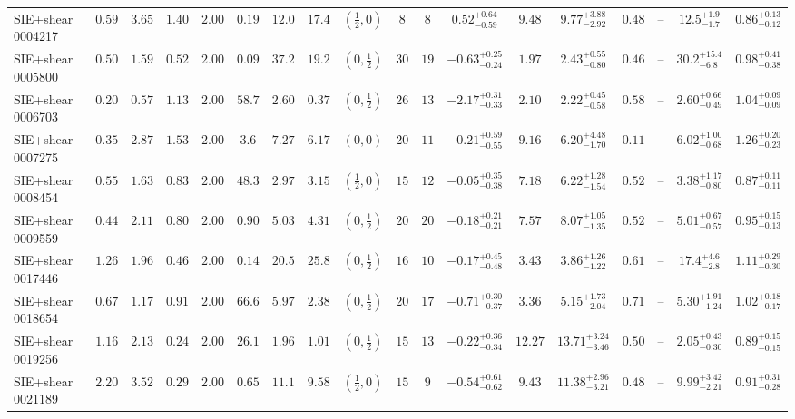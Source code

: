\begin{longtable}{@{}lccccccccccccccccc@{}}
SIE+shear 0004217 & $0.59$ & $3.65$ & $1.40$ & $2.00$ & $0.19$ & $12.0$ & $17.4$ & $(\frac12,0)$ & $8$ & $8$ & $0.52^{+0.64}_{-0.59}$ & $9.48$ & $9.77^{+3.88}_{-2.92}$ & $0.48$ & -- & $12.5^{+1.9}_{-1.7}$ & $0.86^{+0.13}_{-0.12}$\\
SIE+shear 0005800 & $0.50$ & $1.59$ & $0.52$ & $2.00$ & $0.09$ & $37.2$ & $19.2$ & $(0,\frac12)$ & $30$ & $19$ & $-0.63^{+0.25}_{-0.24}$ & $1.97$ & $2.43^{+0.55}_{-0.80}$ & $0.46$ & -- & $30.2^{+15.4}_{-6.8}$ & $0.98^{+0.41}_{-0.38}$\\
SIE+shear 0006703 & $0.20$ & $0.57$ & $1.13$ & $2.00$ & $58.7$ & $2.60$ & $0.37$ & $(0,\frac12)$ & $26$ & $13$ & $-2.17^{+0.31}_{-0.33}$ & $2.10$ & $2.22^{+0.45}_{-0.58}$ & $0.58$ & -- & $2.60^{+0.66}_{-0.49}$ & $1.04^{+0.09}_{-0.09}$\\
SIE+shear 0007275 & $0.35$ & $2.87$ & $1.53$ & $2.00$ & $3.6$ & $7.27$ & $6.17$ & $(0,0)$ & $20$ & $11$ & $-0.21^{+0.59}_{-0.55}$ & $9.16$ & $6.20^{+4.48}_{-1.70}$ & $0.11$ & -- & $6.02^{+1.00}_{-0.68}$ & $1.26^{+0.20}_{-0.23}$\\
SIE+shear 0008454 & $0.55$ & $1.63$ & $0.83$ & $2.00$ & $48.3$ & $2.97$ & $3.15$ & $(\frac12,0)$ & $15$ & $12$ & $-0.05^{+0.35}_{-0.38}$ & $7.18$ & $6.22^{+1.28}_{-1.54}$ & $0.52$ & -- & $3.38^{+1.17}_{-0.80}$ & $0.87^{+0.11}_{-0.11}$\\
SIE+shear 0009559 & $0.44$ & $2.11$ & $0.80$ & $2.00$ & $0.90$ & $5.03$ & $4.31$ & $(0,\frac12)$ & $20$ & $20$ & $-0.18^{+0.21}_{-0.21}$ & $7.57$ & $8.07^{+1.05}_{-1.35}$ & $0.52$ & -- & $5.01^{+0.67}_{-0.57}$ & $0.95^{+0.15}_{-0.13}$\\
SIE+shear 0017446 & $1.26$ & $1.96$ & $0.46$ & $2.00$ & $0.14$ & $20.5$ & $25.8$ & $(0,\frac12)$ & $16$ & $10$ & $-0.17^{+0.45}_{-0.48}$ & $3.43$ & $3.86^{+1.26}_{-1.22}$ & $0.61$ & -- & $17.4^{+4.6}_{-2.8}$ & $1.11^{+0.29}_{-0.30}$\\
SIE+shear 0018654 & $0.67$ & $1.17$ & $0.91$ & $2.00$ & $66.6$ & $5.97$ & $2.38$ & $(0,\frac12)$ & $20$ & $17$ & $-0.71^{+0.30}_{-0.37}$ & $3.36$ & $5.15^{+1.73}_{-2.04}$ & $0.71$ & -- & $5.30^{+1.91}_{-1.24}$ & $1.02^{+0.18}_{-0.17}$\\
SIE+shear 0019256 & $1.16$ & $2.13$ & $0.24$ & $2.00$ & $26.1$ & $1.96$ & $1.01$ & $(0,\frac12)$ & $15$ & $13$ & $-0.22^{+0.36}_{-0.34}$ & $12.27$ & $13.71^{+3.24}_{-3.46}$ & $0.50$ & -- & $2.05^{+0.43}_{-0.30}$ & $0.89^{+0.15}_{-0.15}$\\
SIE+shear 0021189 & $2.20$ & $3.52$ & $0.29$ & $2.00$ & $0.65$ & $11.1$ & $9.58$ & $(\frac12,0)$ & $15$ & $9$ & $-0.54^{+0.61}_{-0.62}$ & $9.43$ & $11.38^{+2.96}_{-3.21}$ & $0.48$ & -- & $9.99^{+3.42}_{-2.21}$ & $0.91^{+0.31}_{-0.28}$\\

\end{longtable}

